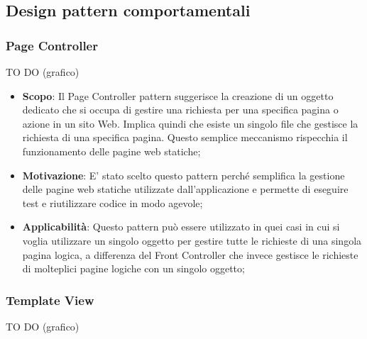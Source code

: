 
	\clearpage 
	\newpage
	\subsection{Design pattern comportamentali} %
		\subsubsection{Page Controller} %
		TO DO (grafico)

		\begin{itemize}
			\item \textbf{Scopo}: Il Page Controller pattern suggerisce la creazione di un oggetto dedicato che si occupa di gestire una richiesta per una specifica pagina o azione in un sito Web. Implica quindi che esiste un singolo file che gestisce la richiesta di una specifica pagina. Questo semplice meccanismo rispecchia il funzionamento delle pagine web statiche;
					
			\item \textbf{Motivazione}: E' stato scelto questo pattern perché semplifica la gestione delle pagine web statiche utilizzate dall'applicazione e permette di eseguire test e riutilizzare codice in modo agevole;
			
			\item \textbf{Applicabilità}: Questo pattern può essere utilizzato in quei casi in cui si voglia utilizzare un singolo oggetto per gestire tutte le richieste di una singola pagina logica, a differenza del Front Controller che invece gestisce le richieste di molteplici pagine logiche con un singolo oggetto;

		\end{itemize}

		\newpage
		\subsubsection{Template View} %
		TO DO (grafico)


